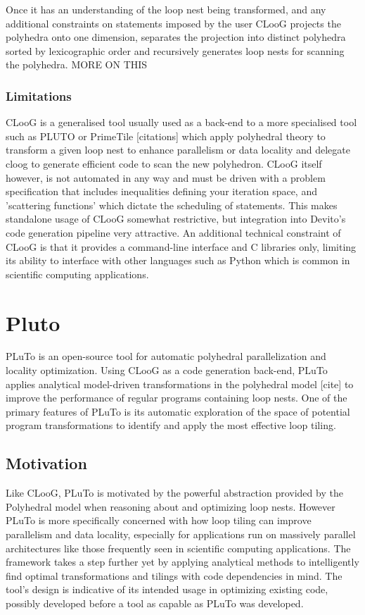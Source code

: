 \documentclass[a4paper,12pt,twoside]{report}
\begin{document}
\begin{itemize}
Once it has an understanding of the loop nest being transformed, and any additional constraints on statements imposed by the user
CLooG projects the polyhedra onto one dimension, separates the projection into distinct polyhedra sorted by lexicographic order and 
recursively generates loop nests for scanning the polyhedra. MORE ON THIS

\subsubsection{Limitations}
CLooG is a generalised tool usually used as a back-end to a more specialised tool such as PLUTO or PrimeTile [citations] which
apply polyhedral theory to transform a given loop nest to enhance parallelism or data locality and delegate cloog to generate
efficient code to scan the new polyhedron. CLooG itself however, is not automated in any way and must be driven with a problem
specification that includes inequalities defining your iteration space, and 'scattering functions' which dictate the scheduling
of statements. This makes standalone usage of CLooG somewhat restrictive, but integration into Devito's code generation pipeline
very attractive. An additional technical constraint of CLooG is that it provides a command-line interface and C libraries only,
limiting its ability to interface with other languages such as Python which is common in scientific computing applications.

\section{Pluto}
PLuTo is an open-source tool for automatic polyhedral parallelization and locality optimization. Using CLooG as a code generation
back-end, PLuTo applies analytical model-driven transformations in the polyhedral model [cite] to improve the performance
of regular programs containing loop nests. One of the primary features of PLuTo is its automatic exploration of the space
of potential program transformations to identify and apply the most effective loop tiling.

\subsection{Motivation}
Like CLooG, PLuTo is motivated by the powerful abstraction provided by the Polyhedral model when reasoning about and optimizing loop
nests. However PLuTo is more specifically concerned with how loop tiling can improve parallelism and data locality, especially
for applications run on massively parallel architectures like those frequently seen in scientific computing applications. The framework
takes a step further yet by applying analytical methods to intelligently find optimal transformations and tilings with code dependencies in mind.
The tool's design is indicative of its intended usage in optimizing existing code, possibly developed before a tool as capable as PLuTo was developed.


\end{itemize}
\end{document}
